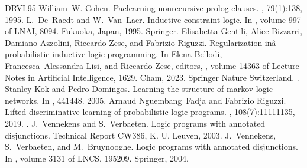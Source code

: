 \documentclass[letterpaper,10pt,english]{sphinxmanual}
\begin{document}
\sphinxAtStartPar


\begin{sphinxthebibliography}{DRVL95}
\sphinxAtStartPar
William W. Cohen. Pac\sphinxhyphen{}learning non\sphinxhyphen{}recursive prolog clauses. , 79(1):1\textendash{}38, 1995.
\sphinxAtStartPar
L. De Raedt and W. Van Laer. Inductive constraint logic. In , volume 997 of LNAI, 80\textendash{}94. Fukuoka, Japan, 1995. Springer.
\sphinxAtStartPar
Elisabetta Gentili, Alice Bizzarri, Damiano Azzolini, Riccardo Zese, and Fabrizio Riguzzi. Regularization inâ probabilistic inductive logic programming. In Elena Bellodi, Francesca Alessandra Lisi, and Riccardo Zese, editors, , volume 14363 of Lecture Notes in Artificial Intelligence, 16\textendash{}29. Cham, 2023. Springer Nature Switzerland. .
\sphinxAtStartPar
Stanley Kok and Pedro Domingos. Learning the structure of markov logic networks. In , 441\textendash{}448. 2005.
\sphinxAtStartPar
Arnaud Nguembang Fadja and Fabrizio Riguzzi. Lifted discriminative learning of probabilistic logic programs. , 108(7):1111\textendash{}1135, 2019. .
\sphinxAtStartPar
J. Vennekens and S. Verbaeten. Logic programs with annotated disjunctions. Technical Report CW386, K. U. Leuven, 2003.
\sphinxAtStartPar
J. Vennekens, S. Verbaeten, and M. Bruynooghe. Logic programs with annotated disjunctions. In , volume 3131 of LNCS, 195\textendash{}209. Springer, 2004.
\end{sphinxthebibliography}



\renewcommand{\indexname}{Index}
\printindex
\end{document}
